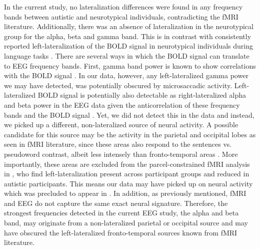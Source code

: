 In the current study, no lateralization differences were found in any frequency bands between autistic and neurotypical individuals, contradicting the fMRI literature. Additionally, there was an absence of lateralization in the neurotypical group for the alpha, beta and gamma band. This is in contrast with consistently reported left-lateralization of the BOLD signal in neurotypical individuals during language tasks \citep{fedorenko2010,pallier2011}. There are several ways in which the BOLD signal can translate to EEG frequency bands. First, gamma band power is known to show correlations with the BOLD signal \citep{scheeringa2016}. In our data, however, any left-lateralized gamma power we may have detected, was potentially obscured by microsaccadic activity. Left-lateralized BOLD signal is potentially also detectable as right-lateralized alpha and beta power in the EEG data given the anticorrelation of these frequency bands and the BOLD signal \citep{scheeringa2016}. Yet, we did not detect this in the data and instead, we picked up a different, non-lateralized source of neural activity. A possible candidate for this source may be the activity in the parietal and occipital lobes as seen in fMRI literature, since these areas also respond to the sentences vs. pseudoword contrast, albeit less intensely than fronto-temporal areas \citep{fedorenko2010}. More importantly, these areas are excluded from the parcel-constrained fMRI analysis in \cite{jouravlev2020}, who find left-lateralization present across participant groups and reduced in autistic participants. This means our data may have picked up on neural activity which was precluded to appear in \cite{jouravlev2020}. In addition, as previously mentioned, fMRI and EEG do not capture the same exact neural signature. Therefore, the strongest frequencies detected in the current EEG study, the alpha and beta band, may originate from a non-lateralized parietal or occipital source and may have obscured the left-lateralized fronto-temporal sources known from fMRI literature.

